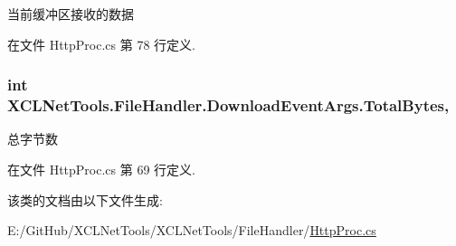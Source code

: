 当前缓冲区接收的数据 



在文件 Http\+Proc.\+cs 第 78 行定义.

\subsubsection[{\texorpdfstring{Total\+Bytes}{TotalBytes}}]{\setlength{\rightskip}{0pt plus 5cm}int X\+C\+L\+Net\+Tools.\+File\+Handler.\+Download\+Event\+Args.\+Total\+Bytes\hspace{0.3cm}{\ttfamily [get]}, {\ttfamily [set]}}\hypertarget{class_x_c_l_net_tools_1_1_file_handler_1_1_download_event_args_a344cbcca5a213a50ecd25b90340be816}{}\label{class_x_c_l_net_tools_1_1_file_handler_1_1_download_event_args_a344cbcca5a213a50ecd25b90340be816}


总字节数 



在文件 Http\+Proc.\+cs 第 69 行定义.



该类的文档由以下文件生成\+:\begin{DoxyCompactItemize}
\item 
E\+:/\+Git\+Hub/\+X\+C\+L\+Net\+Tools/\+X\+C\+L\+Net\+Tools/\+File\+Handler/\hyperlink{_http_proc_8cs}{Http\+Proc.\+cs}\end{DoxyCompactItemize}
